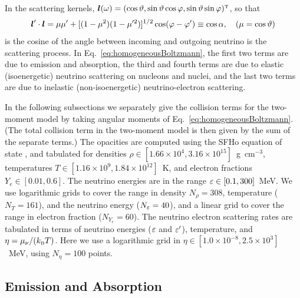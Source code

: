 \documentclass[10pt,preprint]{aastex}
\begin{document}
In the scattering kernels, $\boldsymbol{l}(\omega)=(\cos\vartheta,\sin\vartheta\cos\varphi,\sin\vartheta\sin\varphi)^{\mbox{\tiny T}}$, so that
\begin{equation}
 \boldsymbol{l}'\cdot\boldsymbol{l}  = \mu\mu' + [(1-\mu^2)(1-\mu'^{2})]^{1/2}\cos(\varphi-\varphi')
 \equiv \cos\alpha,
 \quad(\mu=\cos\vartheta)
\end{equation}
is the cosine of the angle between incoming and outgoing neutrino is the scattering process.  
In Eq.~\eqref{eq:homogeneousBoltzmann}, the first two terms are due to emission and absorption, the third and fourth terms are due to elastic (isoenergetic) neutrino scattering on nucleons and nuclei, and the last two terms are due to inelastic (non-isoenergetic) neutrino-electron scattering.  

In the following subsections we separately give the collision terms for the two-moment model by taking angular moments of Eq.~\eqref{eq:homogeneousBoltzmann}.  
(The total collision term in the two-moment model is then given by the sum of the separate terms.)  
The opacities are computed using the SFHo equation of state \citep{steiner_etal_2013}, and tabulated for densities $\rho\in[1.66\times10^{4},3.16\times10^{15}]$~g~cm$^{-3}$, temperatures $T\in[1.16\times10^{9},1.84\times10^{12}]$~K, and electron fractions $Y_{e}\in[0.01,0.6]$.  
The neutrino energies are in the range $\varepsilon\in[0.1,300]$~MeV.  
We use logarithmic grids to cover the range in density $N_{\rho}=308$, temperature ($N_{T}=161$), and the neutrino energy ($N_{\varepsilon}=40$), and a linear grid to cover the range in electron fraction ($N_{Y_{e}}=60$).  
The neutrino electron scattering rates are tabulated in terms of neutrino energies ($\varepsilon$ and $\varepsilon'$), temperature, and $\eta=\mu_{\nu}/(k_{\mbox{\tiny B}}T)$.  
Here we use a logarithmic grid in $\eta\in[1.0\times10^{-8},2.5\times10^{3}]$~MeV, using $N_{\eta}=100$ points.  

\subsection{Emission and Absorption}
\end{document}
